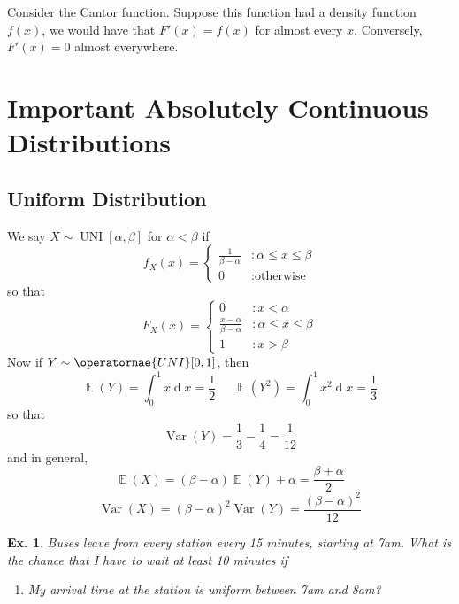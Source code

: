 \documentclass[12pt, a4paper]{book}
\DeclareMathOperator{\E}{\mathbb{E}}
\DeclareMathOperator{\Var}{Var}
\renewcommand{\d}[1]{\ensuremath{\operatorname{d}\!{#1}}} %
\newtheorem{example}[theorem]{Ex.}
\theoremstyle{nonumberplain}
\begin{document}
Consider the Cantor function.
Suppose this function had a density function $f(x)$, we would have that $F'(x)=f(x)$ for almost every $x$.
Conversely, $F'(x)=0$ almost everywhere.
\section{Important Absolutely Continuous Distributions}
\subsection{Uniform Distribution}
We say $X\sim\operatorname{UNI}[\alpha,\beta]$ for $\alpha<\beta$ if
\[f_X(x)=
    \begin{cases}
        \frac{1}{\beta-\alpha} &:\alpha\leq x\leq\beta\\
        0 &:\text{otherwise}
    \end{cases}
\]
so that
\[F_X(x)=
    \begin{cases}
        0 &:x <\alpha\\
        \frac{x-\alpha}{\beta-\alpha} &:\alpha\leq x\leq\beta\\
        1 &:x >\beta
    \end{cases}
\]
Now if $Y\sim\operatornae{UNI}[0,1]$, then
\[\E(Y)=\int_0^1 x\d{x}=\frac{1}{2},\quad\E(Y^2)=\int_0^1 x^2\d{x}=\frac{1}{3}\]
so that
\[\Var(Y)=\frac{1}{3}-\frac{1}{4}=\frac{1}{12}\]
and in general,
\[\E(X)=(\beta-\alpha)\E(Y)+\alpha=\frac{\beta+\alpha}{2}\]
\[\Var(X)=(\beta-\alpha)^2\Var(Y)=\frac{(\beta-\alpha)^2}{12}\]
\begin{example}
    Buses leave from every station every 15 minutes, starting at 7am.
    What is the chance that I have to wait at least 10 minutes if
    \begin{enumerate}
        \item My arrival time at the station is uniform between 7am and 8am?
    \end{enumerate}
\end{example}
\end{document}
